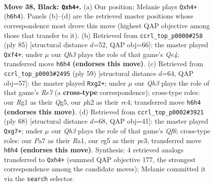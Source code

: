 \documentclass[11pt]{article}
\begin{document}
\clearpage

\begin{figure}[p]\centering
\begin{subfigure}{0.46\textwidth}\centering
\resizebox{\linewidth}{!}{%
\newchessgame
\chessboard[
  setfen={7k/p2p4/2p2p1q/6R1/1P1P3Q/7K/5P1P/6r1 b - - 0 38},
  showmover=false,
  pgfstyle=straightmove, color=movearrow, markmove={h6-h4}
]}
\caption{}
\end{subfigure}\hfill
\begin{subfigure}{0.46\textwidth}\centering
\resizebox{\linewidth}{!}{%
\newchessgame
\chessboard[
  setfen={6k1/6p1/7p/4q3/p2R1Q2/P7/1P3PPK/2r5 b - - 4 43},
  showmover=false,
  pgfstyle=straightmove, color=movearrow, markmove={e5-f4}
]}
\caption{}
\end{subfigure}
\\[4pt]
\begin{subfigure}{0.46\textwidth}\centering
\resizebox{\linewidth}{!}{%
\newchessgame
\chessboard[
  setfen={6k1/5p2/6p1/6q1/p1R5/6PP/PP2r1QK/3R4 b - - 0 30},
  showmover=false,
  pgfstyle=straightmove, color=movearrow, markmove={e2-g2}
]}
\caption{}
\end{subfigure}\hfill
\begin{subfigure}{0.46\textwidth}\centering
\resizebox{\linewidth}{!}{%
\newchessgame
\chessboard[
  setfen={4r2k/p5qp/4PQ2/2p5/P6P/2pP4/6P1/R3K3 w Q - 3 35},
  showmover=false,
  pgfstyle=straightmove, color=movearrow, markmove={f6-g7}
]}
\caption{}
\end{subfigure}
\caption{\textbf{Move 38, Black: \texttt{Qxh4+}.} (a) Our position; Melanie plays \texttt{Qxh4+} (\texttt{h6h4}). Panels (b)--(d) are the retrieved master positions whose correspondence most drove this move (highest QAP objective among those that transfer to it). (b) Retrieved from \texttt{ccrl\_top\_p0000\#258} (ply 85) [structural distance $d$=52, QAP obj=66]: the master played \texttt{Qxf4+}; under $\mu$ our \emph{Qh3} plays the role of that game's \emph{Qe4}; transferred move \texttt{h6h4} \textbf{(endorses this move)}. (c) Retrieved from \texttt{ccrl\_top\_p0003\#2495} (ply 59) [structural distance $d$=64, QAP obj=57]: the master played \texttt{Rxg2+}; under $\mu$ our \emph{Qh3} plays the role of that game's \emph{Re7} (a \textbf{cross-type} correspondence); cross-type roles: our \emph{R}g1 as their \emph{Q}g5, our \emph{p}h2 as their \emph{r}c4; transferred move \texttt{h6h4} \textbf{(endorses this move)}. (d) Retrieved from \texttt{ccrl\_top\_p0002\#3921} (ply 68) [structural distance $d$=68, QAP obj=41]: the master played \texttt{Qxg7+}; under $\mu$ our \emph{Qh3} plays the role of that game's \emph{Qf6}; cross-type roles: our \emph{P}a7 as their \emph{R}a1, our \emph{r}g5 as their \emph{p}c3; transferred move \texttt{h6h4} \textbf{(endorses this move)}. Synthesis: 4 retrieved analogs transferred to \texttt{Qxh4+} (summed QAP objective 177, the strongest correspondence among the candidate moves); Melanie committed it via the \texttt{search} selector.}
\label{fig:thought-m75}
\end{figure}
\end{document}
